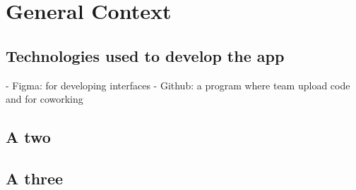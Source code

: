 \chapter{General Context}\label{ch:A}
\section{Technologies used to develop the app}
- Figma: for developing interfaces
- Github: a program where team upload code and for coworking
\section{A two}
\section{A three}